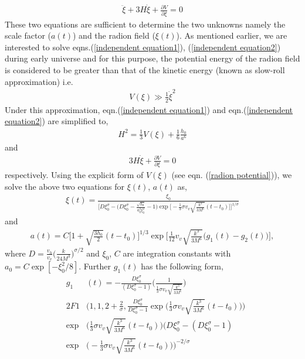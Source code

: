 \documentclass[a4paper]{article}
\begin{document}
\begin{eqnarray}
 \ddot{\xi} + 3H\dot{\xi} + \frac{\partial V}{\partial\xi} = 0
 \label{independent equation2}
\end{eqnarray}
These two equations are sufficient to determine the two unknowns namely the scale factor ($a(t)$) and the radion field ($\xi(t)$). 
As mentioned earlier, we are interested to solve eqns.(\ref{independent equation1}), (\ref{independent equation2}) during early universe 
and for this purpose, the potential energy of the radion field 
is considered to be greater than that of the kinetic energy (known as slow-roll approximation) i.e.
\begin{eqnarray}
 V(\xi) \gg \frac{1}{2}\dot{\xi}^2
 \label{slow roll approximation}
\end{eqnarray}
Under this approximation, eqn.(\ref{independent equation1}) and eqn.(\ref{independent equation2}) are simplified to,
\begin{eqnarray}
 H^2 = \frac{1}{3}V(\xi) + \frac{1}{6}\frac{h_0}{a^6}
 \label{slow roll equation1}
\end{eqnarray}
and
\begin{eqnarray}
 3H\dot{\xi} + \frac{\partial V}{\partial\xi} = 0
 \label{slow roll equation2}
\end{eqnarray}
respectively. Using the explicit form of $V(\xi)$ (see eqn. (\ref{radion potential})), we solve the above two equations 
for $\xi(t)$, $a(t)$ as,
\begin{eqnarray}
 \xi(t) = \frac{\xi_0}{\bigg[D\xi_0^{\sigma}-\big(D\xi_0^{\sigma}-\frac{\sqrt{h_0}}{a_0^3\xi_0^2}-1\big)\exp
 {\big[-\frac{1}{3}\sigma v_v\sqrt{\frac{k^3}{3M^6}}(t-t_0)\big]}\bigg]^{1/\sigma}}
 \label{sol of radion}
\end{eqnarray}
and
\begin{eqnarray}
 a(t) = C \bigg[1 + \sqrt{\frac{3h_0}{2}}(t-t_0)\bigg]^{1/3} \exp{\bigg[\frac{1}{12}v_v\sqrt{\frac{k^3}{3M^6}} \big(g_1(t)-g_2(t)\big)\bigg]} ,
 \label{sol of scale}
\end{eqnarray}
where $D = \frac{v_h}{v_v}\big(\frac{k}{24M^3}\big)^{\sigma/2}$ and $\xi_0$, $C$ are integration constants 
with $a_0=C \exp{[-\xi_0^2/8]}$. Further $g_1(t)$ has the following form,
\begin{eqnarray}
 &g_1&(t)= - \frac{D\xi_0^{\sigma}}{(D\xi_0^{\sigma}-1)} \bigg(\frac{1}{\frac{1}{3}\sigma v_v\sqrt{\frac{k^3}{3M^6}}}\bigg)\nonumber\\
 &2F1&\bigg(1,1,2+\frac{2}{\sigma},\frac{D\xi_0^{\sigma}}{D\xi_0^{\sigma}-1}
 \exp{\big(\frac{1}{3}\sigma v_v\sqrt{\frac{k^3}{3M^6}}(t-t_0)\big)}\bigg)\nonumber\\
 &\exp&{\bigg(\frac{1}{3}\sigma v_v\sqrt{\frac{k^3}{3M^6}}(t-t_0)\bigg)} \bigg(D\xi_0^{\sigma}-(D\xi_0^{\sigma}-1)\nonumber\\ 
 &\exp&{\big(-\frac{1}{3}\sigma v_v\sqrt{\frac{k^3}{3M^6}}(t-t_0)\big)}\bigg)^{-2/\sigma}
 \label{g1}
\end{eqnarray}
\end{document}
